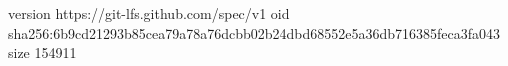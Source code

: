 version https://git-lfs.github.com/spec/v1
oid sha256:6b9cd21293b85cea79a78a76dcbb02b24dbd68552e5a36db716385feca3fa043
size 154911
